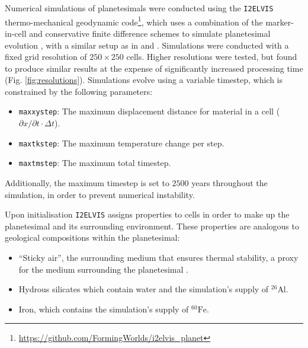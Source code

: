 \documentclass[fleqn,usenatbib]{mnras}
\newcommand{\atom}[2]{$^{#2}\text{#1}$}
\newcommand{\elvis}{\texttt{I2ELVIS}}
\newcommand{\al}{\atom{Al}{26}}
\newcommand{\fe}{\atom{Fe}{60}}
\begin{document}
Numerical simulations of planetesimals were conducted using the \elvis{} thermo-mechanical geodynamic code\footnote{\url{https://github.com/FormingWorlds/i2elvis_planet}}, which uses a combination of the marker-in-cell and conservative finite difference schemes to simulate planetesimal evolution \citep{geryaCharacteristicsbasedMarkerincellMethod2003a,2007PEPI..163...83G}, with a similar setup as in \citet{lichtenbergWaterBudgetDichotomy2019} and \citet{2021Sci...371..365L}. 
Simulations were conducted with a fixed grid resolution of $250 \times 250$ cells.
Higher resolutions were tested, but found to produce similar results at the expense of significantly increased processing time (Fig. \ref{fig:resolutions}).
Simulations evolve using a variable timestep, which is constrained by the following parameters:

\begin{itemize}
  \item \texttt{maxxystep}: The maximum displacement distance for material in a cell ($\partial x / \partial t \cdot \Delta t$).
  \item \texttt{maxtkstep}: The maximum temperature change per step.
  \item \texttt{maxtmstep}: The maximum total timestep.
\end{itemize}

\noindent
Additionally, the maximum timestep is set to $2500$ years throughout the simulation, in order to prevent numerical instability.

Upon initialisation \elvis{} assigns properties to cells in order to make up the planetesimal and its surrounding environment.
These properties are analogous to geological compositions within the planetesimal:%

\begin{itemize}
  \item ``Sticky air'', the surrounding medium that ensures thermal stability, a proxy for the medium surrounding the planetesimal \citep{crameriComparisonNumericalSurface2012}.
  \item Hydrous silicates which contain water and the simulation's supply of \al{}.
  \item Iron, which contains the simulation's supply of \fe{}.
\end{itemize}
\end{document}
